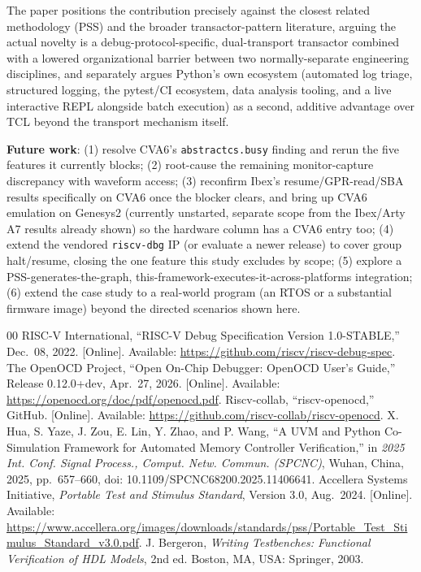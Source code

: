 \documentclass[conference]{IEEEtran}
\begin{document}
The paper positions the contribution precisely against the closest related methodology (PSS) and the broader transactor-pattern literature, arguing the actual novelty is a debug-protocol-specific, dual-transport transactor combined with a lowered organizational barrier between two normally-separate engineering disciplines, and separately argues Python's own ecosystem (automated log triage, structured logging, the pytest/CI ecosystem, data analysis tooling, and a live interactive REPL alongside batch execution) as a second, additive advantage over TCL beyond the transport mechanism itself.

\textbf{Future work}: (1) resolve CVA6's \texttt{abstractcs.busy} finding and rerun the five features it currently blocks; (2) root-cause the remaining monitor-capture discrepancy with waveform access; (3) reconfirm Ibex's resume/GPR-read/SBA results specifically on CVA6 once the blocker clears, and bring up CVA6 emulation on Genesys2 (currently unstarted, separate scope from the Ibex/Arty A7 results already shown) so the hardware column has a CVA6 entry too; (4) extend the vendored \texttt{riscv-dbg} IP (or evaluate a newer release) to cover group halt/resume, closing the one feature this study excludes by scope; (5) explore a PSS-generates-the-graph, this-framework-executes-it-across-platforms integration; (6) extend the case study to a real-world program (an RTOS or a substantial firmware image) beyond the directed scenarios shown here.

\begin{thebibliography}{00}
 RISC-V International, ``RISC-V Debug Specification Version 1.0-STABLE,'' Dec.~08, 2022. [Online]. Available: \url{https://github.com/riscv/riscv-debug-spec}.
 The OpenOCD Project, ``Open On-Chip Debugger: OpenOCD User's Guide,'' Release 0.12.0+dev, Apr.~27, 2026. [Online]. Available: \url{https://openocd.org/doc/pdf/openocd.pdf}.
 Riscv-collab, ``riscv-openocd,'' GitHub. [Online]. Available: \url{https://github.com/riscv-collab/riscv-openocd}.
 X. Hua, S. Yaze, J. Zou, E. Lin, Y. Zhao, and P. Wang, ``A UVM and Python Co-Simulation Framework for Automated Memory Controller Verification,'' in \textit{2025 Int. Conf. Signal Process., Comput. Netw. Commun. (SPCNC)}, Wuhan, China, 2025, pp.~657--660, doi: 10.1109/SPCNC68200.2025.11406641.
 Accellera Systems Initiative, \textit{Portable Test and Stimulus Standard}, Version 3.0, Aug.~2024. [Online]. Available: \url{https://www.accellera.org/images/downloads/standards/pss/Portable_Test_Stimulus_Standard_v3.0.pdf}.
 J. Bergeron, \textit{Writing Testbenches: Functional Verification of HDL Models}, 2nd ed. Boston, MA, USA: Springer, 2003.
\end{thebibliography}
\end{document}
